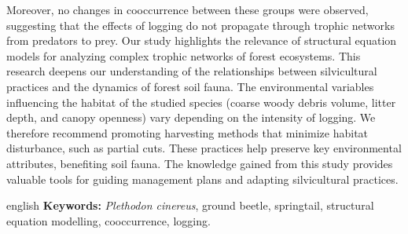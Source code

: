 Moreover, no changes in cooccurrence between these groups were observed, suggesting that the effects of logging do not propagate through trophic networks from predators to prey. 
Our study highlights the relevance of structural equation models for analyzing complex trophic networks of forest ecosystems. 
This research deepens our understanding of the relationships between silvicultural practices and the dynamics of forest soil fauna. 
The environmental variables influencing the habitat of the studied species (coarse woody debris volume, litter depth, and canopy openness) vary depending on the intensity of logging. 
We therefore recommend promoting harvesting methods that minimize habitat disturbance, such as partial cuts. 
These practices help preserve key environmental attributes, benefiting soil fauna. 
The knowledge gained from this study provides valuable tools for guiding management plans and adapting silvicultural practices. 

\begin{otherlanguage*}{english}
  \textbf{Keywords:} \textit{Plethodon cinereus}, ground beetle, springtail, structural equation modelling, cooccurrence, logging.
  
\end{otherlanguage*}
